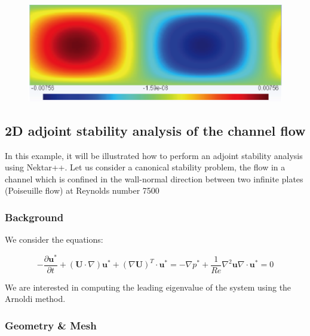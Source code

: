 \begin{figure}[!htbp]
\centering
 {\includegraphics[width=1 \textwidth]{Figures/chan_v}}
    \caption {}
\end{figure}

 \subsection{2D adjoint stability analysis of the channel flow}

 In this example, it will be illustrated how to perform an adjoint stability analysis using Nektar++. Let us consider a canonical stability problem, the flow in a channel which is confined in the wall-normal direction between two infinite plates (Poiseuille flow) at Reynolds number 7500
 
 \subsubsection{Background}
 
  We consider the equations: 
  
  \begin{subequations}
  \begin{equation}
  -\frac{\partial \mathbf{u}^*}{\partial t}+(\mathbf{U} \cdot \nabla)\mathbf{u}^*+(\nabla \mathbf{U})^T \cdot \mathbf{u}^*=-\nabla p^*+\frac{1}{Re} \nabla^2 \mathbf{u}
  \end{equation}
  
  \begin{equation}
  \nabla \cdot \mathbf{u}^*=0
  \end{equation} 
  \end{subequations}
  
  We are interested in computing the leading eigenvalue of the system using the Arnoldi method.
  
 \subsubsection{Geometry \& Mesh}
 
